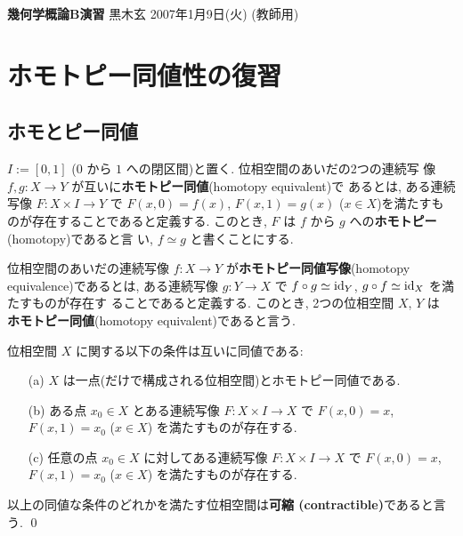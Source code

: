 \documentclass[12pt,twoside]{jarticle}
\newcommand\commentout[1]{#1}
\newcommand\commentout[1]{}
\begin{document}
\noindent
{\Large\bf 幾何学概論B演習}
\hfill
{\large 黒木玄}
\qquad
2007年1月9日(火)
\commentout{\quad (教師用)}

\tableofcontents



\section{ホモトピー同値性の復習}


\subsection{ホモとピー同値}

$I := [0,1]$ ($0$ から $1$ への閉区間)と置く. 位相空間のあいだの2つの連続写
像 $f,g : X \to Y$ が互いに{\bf ホモトピー同値}(homotopy equivalent)で
あるとは, ある連続写像 $F : X\times I \to Y$ で $F(x,0)=f(x)$,
$F(x,1)=g(x)$ ($x\in X$)を満たすものが存在することであると定義する. 
このとき, $F$ は $f$ から $g$ への{\bf ホモトピー}(homotopy)であると言
い, $f\simeq g$ と書くことにする.

位相空間のあいだの連続写像 $f:X\to Y$ が{\bf ホモトピー同値写像}(homotopy
equivalence)であるとは, ある連続写像 $g:Y\to X$ で %
$f\circ g \simeq \mathop{\mathrm{id}}\nolimits_Y$, $g\circ f \simeq \mathop{\mathrm{id}}\nolimits_X$ を満たすものが存在す
ることであると定義する. このとき, 2つの位相空間 $X$, $Y$ は%
{\bf ホモトピー同値}(homotopy equivalent)であると言う. 

\begin{question}[可縮な位相空間]
 位相空間 $X$ に関する以下の条件は互いに同値である:
 \begin{enumerate}
  \item[(a)] $X$ は一点(だけで構成される位相空間)とホモトピー同値である.
  \item[(b)] ある点 $x_0\in X$ とある連続写像 $F:X\times I\to X$ 
   で $F(x,0)=x$, $F(x,1)=x_0$ ($x\in X$) を満たすものが存在する.
  \item[(c)] 任意の点 $x_0\in X$ に対してある連続写像 $F:X\times I\to X$ 
   で $F(x,0)=x$, $F(x,1)=x_0$ ($x\in X$) を満たすものが存在する.
 \end{enumerate}
 以上の同値な条件のどれかを満たす位相空間は{\bf 可縮 (contractible)}であると言う.
 \qed
\end{question}
\end{document}

